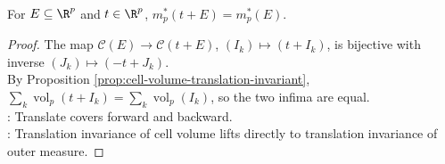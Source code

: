 \begin{theorem} \label{thm:outer-measure-translation-invariance} \\
For $E\subseteq\R^p$ and $t\in\R^p$, $m_p^\ast(t+E)=m_p^\ast(E)$.
\begin{proof} The map $\mathcal{C}(E)\to\mathcal{C}(t+E)$, $(I_k)\mapsto(t+I_k)$, is bijective with inverse $(J_k)\mapsto(-t+J_k)$.\\
By Proposition \ref{prop:cell-volume-translation-invariant}, $\sum_k\operatorname{vol}_p(t+I_k)=\sum_k\operatorname{vol}_p(I_k)$, so the two infima are equal.\\
: Translate covers forward and backward.\\
: Translation invariance of cell volume lifts directly to translation invariance of outer measure.
\end{proof}
\end{theorem}
